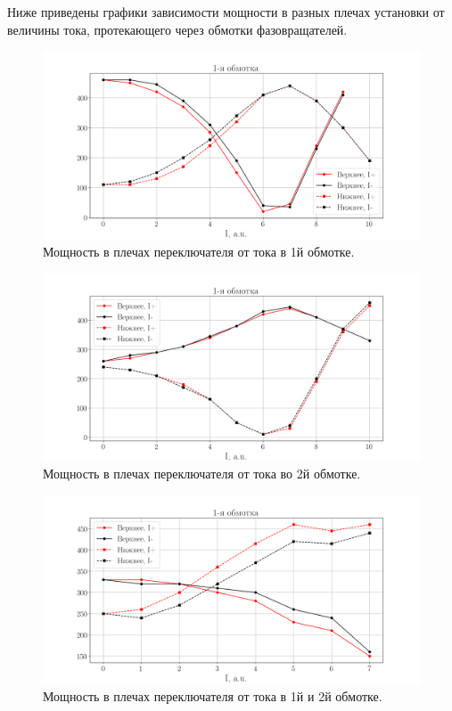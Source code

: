 Ниже приведены графики зависимости мощности в разных плечах установки от величины тока, протекающего через обмотки фазовращателей.
\begin{figure}[H]
    \centering
    \includegraphics[width = 0.9\linewidth]{imgs/graphs/phaser1.png}
    \caption{Мощность в плечах переключателя от тока в 1й обмотке.}
    \label{fig:exp:phaser1}
\end{figure}
\begin{figure}[H]
    \centering
    \includegraphics[width = 0.9\linewidth]{imgs/graphs/phaser2.png}
    \caption{Мощность в плечах переключателя от тока во 2й обмотке.}
    \label{fig:exp:phaser2}
\end{figure}
\begin{figure}[H]
    \centering
    \includegraphics[width = 0.9\linewidth]{imgs/graphs/phaser3.png}
    \caption{Мощность в плечах переключателя от тока в 1й и 2й обмотке.}
    \label{fig:exp:phaser3}
\end{figure}
